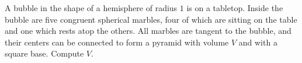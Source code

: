 A bubble in the shape of a hemisphere of radius $1$ is on a tabletop. Inside the bubble are five congruent spherical marbles, four of which are sitting on the table and one which rests atop the others. All marbles are tangent to the bubble, and their centers can be connected to form a pyramid with volume $V$ and with a square base. Compute $V$.